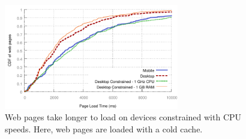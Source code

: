 \begin{figure}[t]
    \includegraphics[width=3in]{../graphs/plt_comparison/plt_differences.pdf}
    \caption[]{\label{fig:plt_differences}Web pages take longer to load on devices constrained with CPU speeds. Here, web pages are loaded with a cold cache.}
\end{figure}
